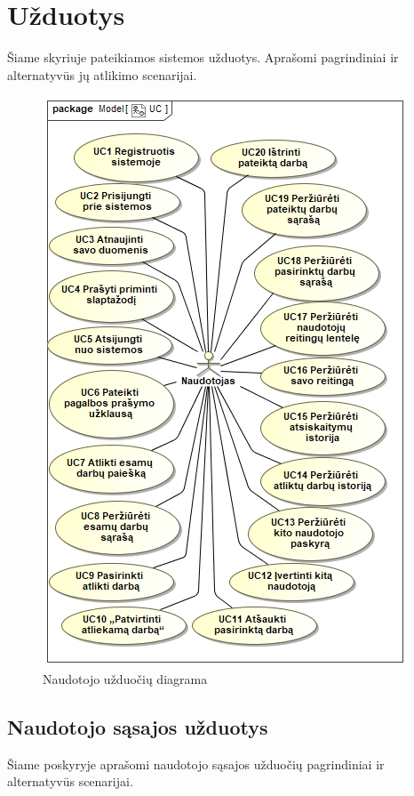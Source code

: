 \documentclass{VUMIFPSbakalaurinis}
\begin{document}
\section{Užduotys}
Šiame skyriuje pateikiamos sistemos užduotys. Aprašomi pagrindiniai ir alternatyvūs jų atlikimo scenarijai.
\begin{figure}[H]
	\centering
	\includegraphics[scale=0.8]{img/UC}
	\caption{Naudotojo užduočių diagrama}
	\label{img:uc}
\end{figure}

\subsection{Naudotojo sąsajos užduotys}
Šiame poskyryje aprašomi naudotojo sąsajos užduočių pagrindiniai ir alternatyvūs scenarijai.
\end{document}
